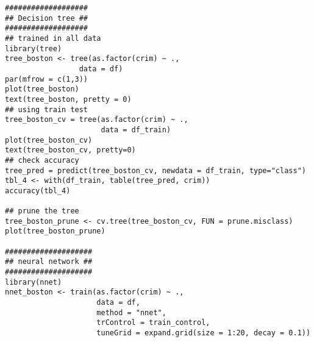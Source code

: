 \documentclass[11pt]{article}
\begin{document}
\begin{verbatim}
###################
## Decision tree ##
###################
## trained in all data
library(tree)
tree_boston <- tree(as.factor(crim) ~ .,
                 data = df)
par(mfrow = c(1,3))
plot(tree_boston)
text(tree_boston, pretty = 0)
## using train test
tree_boston_cv = tree(as.factor(crim) ~ .,
                      data = df_train)
plot(tree_boston_cv)
text(tree_boston_cv, pretty=0)
## check accuracy
tree_pred = predict(tree_boston_cv, newdata = df_train, type="class")
tbl_4 <- with(df_train, table(tree_pred, crim))
accuracy(tbl_4)

## prune the tree
tree_boston_prune <- cv.tree(tree_boston_cv, FUN = prune.misclass)
plot(tree_boston_prune)

####################
## neural network ##
####################
library(nnet)
nnet_boston <- train(as.factor(crim) ~ .,
                     data = df,
                     method = "nnet",
                     trControl = train_control,
                     tuneGrid = expand.grid(size = 1:20, decay = 0.1))
\end{verbatim}
\end{document}
